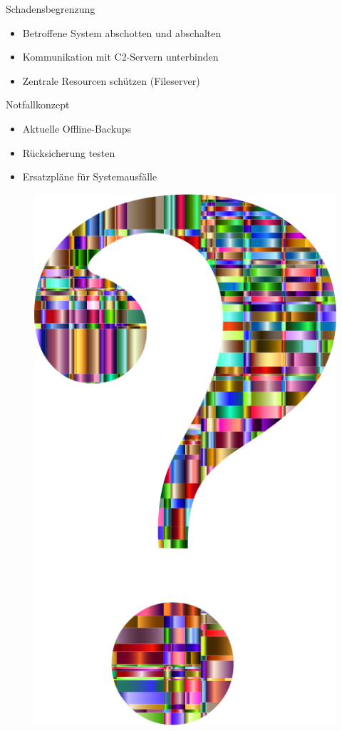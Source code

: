 \documentclass[10pt]{beamer}
\begin{document}
\begin{frame}{Schadensbegrenzung}
	\begin{itemize}
		\item Betroffene System abschotten und abschalten
		\item Kommunikation mit C2-Servern unterbinden
		\item Zentrale Resourcen schützen (Fileserver)
	\end{itemize}
\end{frame}

\begin{frame}{Notfallkonzept}
	\begin{itemize}
		\item Aktuelle Offline-Backups
		\item Rücksicherung testen
						
		\item Ersatzpläne für Systemausfälle
 	\end{itemize}

\end{frame}


{\1
\begin{frame}
\end{frame}}

{\1
\begin{frame}
	\begin{figure}[p]
		\centering
		\includegraphics[scale=0.1]{questionmark.png}
	\end{figure}
\end{frame}}
\end{document}
